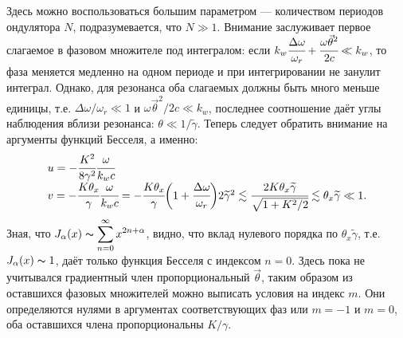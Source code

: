 Здесь можно воспользоваться большим параметром --- количеством периодов ондулятора $N$, подразумевается, что $N \gg 1$. Внимание заслуживает первое слагаемое в фазовом множителе под интегралом: если $k_w \cfrac{\Delta\omega}{\omega_r} + 
\cfrac{\omega\vec{\theta}^2}{2c} \ll k_w$, то фаза меняется медленно на одном периоде и при интегрировании не занулит интеграл. Однако, для резонанса оба слагаемых должны быть много меньше единицы, т.е. $\Delta\omega/\omega_r \ll 1$ и $\omega\vec{\theta}^2/2c \ll k_w$, последнее соотношение даёт углы наблюдения вблизи резонанса: $\theta \ll 1/\widetilde{\gamma}$. Теперь следует обратить внимание на аргументы функций Бесселя, а именно: 
\begin{equation}
	\begin{array}{lcl}
		u = -\cfrac{K^2}{8\gamma^2}\cfrac{\omega}{k_w c}\\
		v = -\cfrac{K{\theta_x}}{\gamma}\cfrac{\omega}{k_w c} = - \cfrac{K{\theta_x}}{\gamma}
		\bigg(1 + \cfrac{\Delta\omega}{\omega_r}\bigg)2\widetilde{\gamma}^2 \lesssim
		\cfrac{2K{\theta_x}\widetilde{\gamma}}{\sqrt{1 + K^2/2}} \lesssim \theta_x\widetilde{\gamma} \ll 1.
	\end{array}	
\end{equation}
Зная, что $J_\alpha(x) \thicksim \displaystyle\sum\limits_{n =0}^{\infty} x^{2n + \alpha} $, видно, что вклад нулевого порядка по $\theta_x\widetilde{\gamma}$, т.е. $J_\alpha(x) \thicksim 1$, даёт только функция Бесселя с индексом $n = 0$. Здесь пока не учитывался градиентный член пропорциональный $\vec{\theta}$, таким образом из оставшихся фазовых множителей можно выписать условия на индекс $m$. Они определяются нулями в аргументах соответствующих фаз или $m = -1$ и $m = 0$, оба оставшихся члена пропорциональны $K/\gamma$. 

